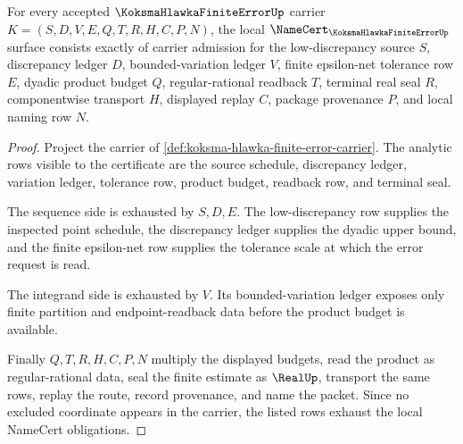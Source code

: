 \begin{theorem}
\label{thm:koksma-hlawka-namecert-obligations}
For every accepted $\KoksmaHlawkaFiniteErrorUp$ carrier $K=(S,D,V,E,Q,T,R,H,C,P,N)$, the local $\NameCert_{\KoksmaHlawkaFiniteErrorUp}$ surface consists exactly of carrier admission for the low-discrepancy source $S$, discrepancy ledger $D$, bounded-variation ledger $V$, finite epsilon-net tolerance row $E$, dyadic product budget $Q$, regular-rational readback $T$, terminal real seal $R$, componentwise transport $H$, displayed replay $C$, package provenance $P$, and local naming row $N$.
\end{theorem}
\begin{proof}
Project the carrier of \autoref{def:koksma-hlawka-finite-error-carrier}. The analytic rows visible to the certificate are the source schedule, discrepancy ledger, variation ledger, tolerance row, product budget, readback row, and terminal seal.

The sequence side is exhausted by $S,D,E$. The low-discrepancy row supplies the inspected point schedule, the discrepancy ledger supplies the dyadic upper bound, and the finite epsilon-net row supplies the tolerance scale at which the error request is read.

The integrand side is exhausted by $V$. Its bounded-variation ledger exposes only finite partition and endpoint-readback data before the product budget is available.

Finally $Q,T,R,H,C,P,N$ multiply the displayed budgets, read the product as regular-rational data, seal the finite estimate as $\RealUp$, transport the same rows, replay the route, record provenance, and name the packet. Since no excluded coordinate appears in the carrier, the listed rows exhaust the local NameCert obligations.
\end{proof}

